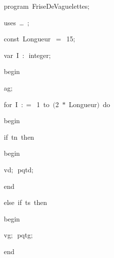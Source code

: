 
{
\parindent {}
\medskip

\carrenoir
\vspace{\neglskip}\mbox{\blc  \idt  \mcl program\idt\ FriseDeVaguelettes$;$
}\par 
\vspace{\neglskip}\mbox{\blc \blk\idt \mcl uses\idt \ \ldots\ $;$
}\par 
\pagebreak[3] 
\vspace{\neglskip}\mbox{\blc  \blk\idt  \mcl const\idt \ Longueur\ $=$\ 15$;$}\par 
\pagebreak[3] 
\vspace{\neglskip}\mbox{\blc  \blk\idt  \mcl var\idt \ I\ $:$\ integer$;$}\par 
\vspace{\neglskip}\mbox{\blc  \idt  \mcl begin\idt }\par 
\vspace{\neglskip}\mbox{\blc  \blk\idt  ag$;$}\par 
\pagebreak[3] 
\vspace{\neglskip}\mbox{\blc  \blk\idt  \mcl for\idt \ I\ $:$$=$\ 1\ \mcl to\idt \ $($2\ $\ast$\ Longueur$)$\ \mcl do\idt }\par 
\vspace{\neglskip}\mbox{\blc  \blk\blk\idt  \mcl begin\idt }\par 
\pagebreak[3] 
\vspace{\neglskip}\mbox{\blc  \blk\blk\blk\idt  \mcl if\idt \ tn\ \mcl then\idt }\par 
\vspace{\neglskip}\mbox{\blc  \blk\blk\blk\blk\idt  \mcl begin\idt }\par 
\vspace{\neglskip}\mbox{\blc  \blk\blk\blk\blk\blk\idt  vd$;$\ pqtd$;$\ }\par 
\vspace{\neglskip}\mbox{\blc  \blk\blk\blk\blk\idt  \mcl end\idt }\par 
\pagebreak[3] 
\vspace{\neglskip}\mbox{\blc  \blk\blk\blk\idt  \mcl else\idt \ \mcl if\idt \ ts\ \mcl then\idt }\par 
\vspace{\neglskip}\mbox{\blc  \blk\blk\blk\blk\idt  \mcl begin\idt }\par 
\vspace{\neglskip}\mbox{\blc  \blk\blk\blk\blk\blk\idt  vg$;$\ pqtg$;$\ }\par 
\vspace{\neglskip}\mbox{\blc  \blk\blk\blk\blk\idt  \mcl end\idt }\par 
}
